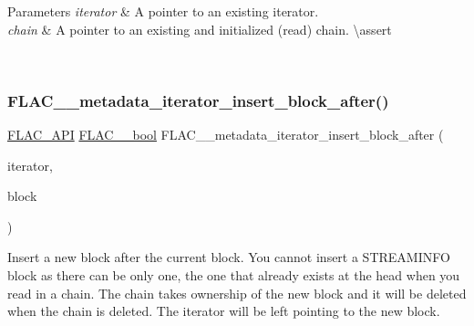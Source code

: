 \begin{DoxyParams}{Parameters}
{\em iterator} & A pointer to an existing iterator. \\
\hline
{\em chain} & A pointer to an existing and initialized (read) chain. \textbackslash{}assert 
\begin{DoxyCode}{1}
\end{DoxyCode}
 
\begin{DoxyCode}{1}
\end{DoxyCode}
 \\
\hline
\end{DoxyParams}
\mbox{\label{group__flac__metadata__level2_ga2f9d8e02bd2e5ffb235af0b02d347d47}} 
\subsubsection{\texorpdfstring{FLAC\_\_metadata\_iterator\_insert\_block\_after()}{FLAC\_\_metadata\_iterator\_insert\_block\_after()}}
{\footnotesize\ttfamily \mbox{\hyperlink{group__flac__export_ga56ca07df8a23310707732b1c0007d6f5}{F\+L\+A\+C\+\_\+\+A\+PI}} \mbox{\hyperlink{ordinals_8h_a95103469f1cbd78b8cf250194985b34e}{F\+L\+A\+C\+\_\+\+\_\+bool}} F\+L\+A\+C\+\_\+\+\_\+metadata\+\_\+iterator\+\_\+insert\+\_\+block\+\_\+after (\begin{DoxyParamCaption}\item[{\mbox{\hyperlink{group__flac__metadata__level2_ga9f3e135a07cdef7e51597646aa7b89b2}{F\+L\+A\+C\+\_\+\+\_\+\+Metadata\+\_\+\+Iterator}} $\ast$}]{iterator,  }\item[{\mbox{\hyperlink{struct_f_l_a_c_____stream_metadata}{F\+L\+A\+C\+\_\+\+\_\+\+Stream\+Metadata}} $\ast$}]{block }\end{DoxyParamCaption})}

Insert a new block after the current block. You cannot insert a S\+T\+R\+E\+A\+M\+I\+N\+FO block as there can be only one, the one that already exists at the head when you read in a chain. The chain takes ownership of the new block and it will be deleted when the chain is deleted. The iterator will be left pointing to the new block.


